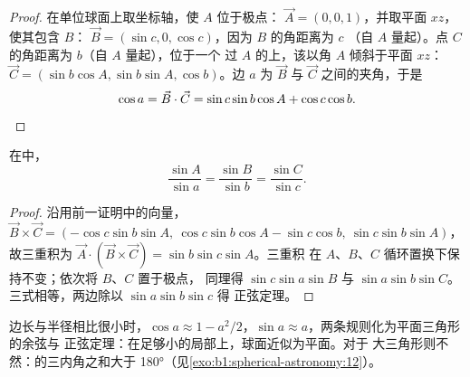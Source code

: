 \begin{proof}
在单位球面上取坐标轴，使 $A$ 位于极点：
$\vec A = (0, 0, 1)$，并取平面 $xz$，使其包含 $B$：
$\vec B = (\sin c, 0, \cos c)$，因为 $B$ 的角距离为 $c$
（自 $A$ 量起）。点 $C$ 的角距离为 $b$（自 $A$ 量起），位于一个
过 $A$ 的上，该以角 $A$ 倾斜于平面 $xz$：
$\vec C = (\sin b\cos A, \sin b\sin A, \cos b)$。边 $a$ 为
$\vec B$ 与 $\vec C$ 之间的夹角，于是
\[
  \cos a = \vec B\cdot\vec C = \sin c\sin b\cos A + \cos c\cos b. \qedhere
\]
\end{proof}

\begin{theorem}[正弦定理]\label{thm:b1:spherical-astronomy:sine-rule}
在中，
\[
  \frac{\sin A}{\sin a} = \frac{\sin B}{\sin b} = \frac{\sin C}{\sin c}.
\]
\end{theorem}

\begin{proof}
沿用前一证明中的向量，
$\vec B \times \vec C = (-\cos c\sin b\sin A,\allowbreak\ \cos c\sin b\cos A - \sin c\cos b,\allowbreak\
\sin c\sin b\sin A)$，故三重积为
$\vec A\cdot(\vec B\times\vec C) = \sin b\sin c\sin A$。三重积
在 $A$、$B$、$C$ 循环置换下保持不变；依次将 $B$、$C$ 置于极点，
同理得 $\sin c\sin a\sin B$ 与 $\sin a\sin b\sin
C$。三式相等，两边除以 $\sin a\sin b\sin c$ 得
正弦定理。
\end{proof}

边长与半径相比很小时，$\cos a \approx 1 -
a^2/2$，$\sin a \approx a$，两条规则化为平面三角形的余弦与
正弦定理：在足够小的局部上，球面近似为平面。对于
大三角形则不然：的三内角之和大于
\ang{180}（见\cref{exo:b1:spherical-astronomy:12}）。

